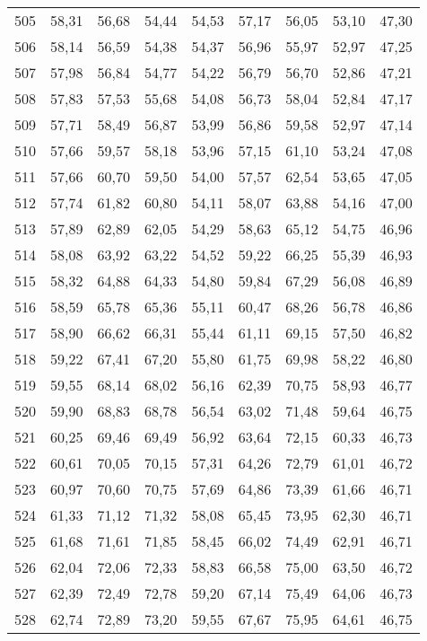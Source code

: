 \begin{longtable}{c c c c c c c c c}
505	& 58,31	& 56,68	& 54,44	& 54,53	& 57,17	& 56,05	& 53,10	& 47,30 \\
506	& 58,14	& 56,59	& 54,38	& 54,37	& 56,96	& 55,97	& 52,97	& 47,25 \\
507	& 57,98	& 56,84	& 54,77	& 54,22	& 56,79	& 56,70	& 52,86	& 47,21 \\
508	& 57,83	& 57,53	& 55,68	& 54,08	& 56,73	& 58,04	& 52,84	& 47,17 \\
509	& 57,71	& 58,49	& 56,87	& 53,99	& 56,86	& 59,58	& 52,97	& 47,14 \\
510	& 57,66	& 59,57	& 58,18	& 53,96	& 57,15	& 61,10	& 53,24	& 47,08 \\
511	& 57,66	& 60,70	& 59,50	& 54,00	& 57,57	& 62,54	& 53,65	& 47,05 \\
512	& 57,74	& 61,82	& 60,80	& 54,11	& 58,07	& 63,88	& 54,16	& 47,00 \\
513	& 57,89	& 62,89	& 62,05	& 54,29	& 58,63	& 65,12	& 54,75	& 46,96 \\
514	& 58,08	& 63,92	& 63,22	& 54,52	& 59,22	& 66,25	& 55,39	& 46,93 \\
515	& 58,32	& 64,88	& 64,33	& 54,80	& 59,84	& 67,29	& 56,08	& 46,89 \\
516	& 58,59	& 65,78	& 65,36	& 55,11	& 60,47	& 68,26	& 56,78	& 46,86 \\
517	& 58,90	& 66,62	& 66,31	& 55,44	& 61,11	& 69,15	& 57,50	& 46,82 \\
518	& 59,22	& 67,41	& 67,20	& 55,80	& 61,75	& 69,98	& 58,22	& 46,80 \\
519	& 59,55	& 68,14	& 68,02	& 56,16	& 62,39	& 70,75	& 58,93	& 46,77 \\
520	& 59,90	& 68,83	& 68,78	& 56,54	& 63,02	& 71,48	& 59,64	& 46,75 \\
521	& 60,25	& 69,46	& 69,49	& 56,92	& 63,64	& 72,15	& 60,33	& 46,73 \\
522	& 60,61	& 70,05	& 70,15	& 57,31	& 64,26	& 72,79	& 61,01	& 46,72 \\
523	& 60,97	& 70,60	& 70,75	& 57,69	& 64,86	& 73,39	& 61,66	& 46,71 \\
524	& 61,33	& 71,12	& 71,32	& 58,08	& 65,45	& 73,95	& 62,30	& 46,71 \\
525	& 61,68	& 71,61	& 71,85	& 58,45	& 66,02	& 74,49	& 62,91	& 46,71 \\
526	& 62,04	& 72,06	& 72,33	& 58,83	& 66,58	& 75,00	& 63,50	& 46,72 \\
527	& 62,39	& 72,49	& 72,78	& 59,20	& 67,14	& 75,49	& 64,06	& 46,73 \\
528	& 62,74	& 72,89	& 73,20	& 59,55	& 67,67	& 75,95	& 64,61	& 46,75 \\

\end{longtable}
